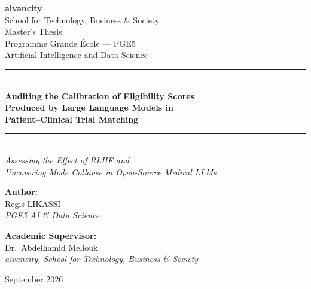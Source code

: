 
\begin{titlepage}
    \centering
    
    \vspace*{1cm}
    
    {\Large\bfseries aivancity}\\[0.3cm]
    {\large School for Technology, Business \& Society}\\[3cm]
    
    {\Large Master's Thesis}\\[0.3cm]
    {\large Programme Grande École — PGE5}\\[0.3cm]
    {\large Artificial Intelligence and Data Science}\\[2.5cm]
    
    \rule{\textwidth}{0.4pt}\\[0.4cm]
    {\LARGE\bfseries Auditing the Calibration of Eligibility Scores \\[0.2cm]
    Produced by Large Language Models in \\[0.2cm]
    Patient--Clinical Trial Matching}\\[0.4cm]
    \rule{\textwidth}{0.4pt}\\[0.4cm]
    
    {\large\itshape Assessing the Effect of RLHF and \\
    Uncovering Mode Collapse in Open-Source Medical LLMs}\\[3cm]
    
    \begin{minipage}[t]{0.45\textwidth}
        \begin{flushleft}
            \textbf{Author:}\\[0.2cm]
            Regis LIKASSI\\[0.3cm]
            \textit{PGE5 AI \& Data Science}
        \end{flushleft}
    \end{minipage}
    \hfill
    \begin{minipage}[t]{0.45\textwidth}
        \begin{flushright}
            \textbf{Academic Supervisor:}\\[0.2cm]
            Dr.\ Abdelhamid Mellouk\\[0.3cm]
            \textit{aivancity, School for Technology, Business \& Society}
        \end{flushright}
    \end{minipage}
    
    \vfill
    
    {\large September 2026}
    
\end{titlepage}